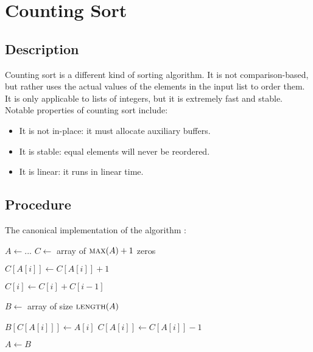 \section{Counting Sort}

\subsection{Description}

Counting sort is a different kind of sorting algorithm. It is not comparison-based, but rather uses the actual values of the elements in the input list to order them. It is only applicable to lists of integers, but it is extremely fast and stable. Notable properties of counting sort include:

\begin{itemize}
    \item It is not in-place: it must allocate auxiliary buffers.
    \item It is stable: equal elements will never be reordered.
    \item It is linear: it runs in linear time.
\end{itemize}

\subsection{Procedure}

The canonical implementation of the algorithm \cite{cormen}:

\begin{algorithmic}[1]
    \State $A \gets ...$
    \State $C \gets$ array of $\Call{max}{A} + 1$ zeros \label{count:counters}
    
     \label{count:count}
        \State $C[A[i]] \gets C[A[i]] + 1$
    \EndFor

     \label{count:sum}
        \State $C[i] \gets C[i] + C[i - 1]$
    \EndFor

    \State $B \gets$ array of size $\Call{length}{A}$ \label{count:output}

     \label{count:sort}
        \State $B[C[A[i]]] \gets A[i]$
        \State $C[A[i]] \gets C[A[i]] - 1$
    \EndFor

    \State $A \gets B$ \label{count:copy}
\end{algorithmic}

